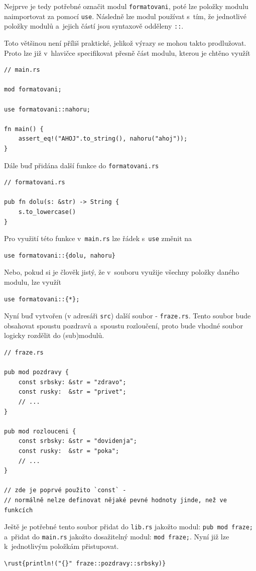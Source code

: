 \documentclass[a4paper, 12pt, twoside]{article} %
\newcommand{\rust}[1]{\texttt{#1}}
\begin{document}
		Nejprve je tedy potřebné označit modul \rust{formatovani}, poté lze položky modulu naimportovat za pomocí \rust{use}. Následně lze modul používat s~tím, že jednotlivé položky modulů a~jejich částí jsou syntaxově odděleny \rust{::}.
		
		Toto většinou není příliš praktické, jelikož výrazy se mohou takto prodlužovat. Proto lze již v~hlavičce specifikovat přesně část modulu, kterou je chtěno využít
		\begin{verbatim}
// main.rs

mod formatovani;

use formatovani::nahoru;

fn main() {
	assert_eq!("AHOJ".to_string(), nahoru("ahoj"));
}
		\end{verbatim}
		
		Dále buď přidána další funkce do \texttt{formatovani.rs}
		\begin{verbatim}
// formatovani.rs

pub fn dolu(s: &str) -> String {
	s.to_lowercase()
}
		\end{verbatim}
		
		Pro využití této funkce v~\texttt{main.rs} lze řádek s~\rust{use} změnit na
		\begin{verbatim}
use formatovani::{dolu, nahoru}
		\end{verbatim}
		
		Nebo, pokud si je člověk jistý, že v~souboru využije všechny položky daného modulu, lze využít
		\begin{verbatim}
use formatovani::{*};
		\end{verbatim}
		
		Nyní buď vytvořen (v adresáři \texttt{src}) další soubor - \texttt{fraze.rs}. Tento soubor bude obsahovat spoustu pozdravů a~spoustu rozloučení, proto bude vhodné soubor logicky rozdělit do (sub)modulů.
		\begin{verbatim}
// fraze.rs

pub mod pozdravy {
	const srbsky: &str = "zdravo";
	const rusky:  &str = "privet";
	// ...
}

pub mod rozlouceni {
	const srbsky: &str = "dovidenja";
	const rusky:  &str = "poka";
	// ...
}

// zde je poprvé použito `const` - 
// normálně nelze definovat nějaké pevné hodnoty jinde, než ve funkcích
		\end{verbatim}
		
		Ještě je potřebné tento soubor přidat do \texttt{lib.rs} jakožto modul: \rust{pub mod fraze;} a~přidat do \texttt{main.rs} jakožto dosažitelný modul: \rust{mod fraze;}. Nyní již lze k~jednotlivým položkám přistupovat.
		\begin{verbatim}
\rust{println!("{}" fraze::pozdravy::srbsky)}
		\end{verbatim}
		
\end{document}
